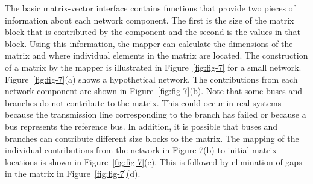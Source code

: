 \documentclass[12pt]{report} %
\begin{document}
The basic matrix-vector interface contains functions that provide two pieces of information about each network component. The first is the size of the matrix block that is contributed by the component and the second is the values in that block. Using this information, the mapper can calculate the dimensions of the matrix and where individual elements in the matrix are located. The construction of a matrix by the mapper is illustrated in  Figure~\ref{fig:fig-7} for a small network. Figure~\ref{fig:fig-7}(a) shows a hypothetical network. The contributions from each network component are shown in  Figure~\ref{fig:fig-7}(b). Note that some buses and branches do not contribute to the matrix. This could occur in real systems because the transmission line corresponding to the branch has failed or because a bus represents the reference bus. In addition, it is possible that buses and branches can contribute different size blocks to the matrix. The mapping of the individual contributions from the network in Figure 7(b) to initial matrix locations is shown in  Figure~\ref{fig:fig-7}(c). This is followed by elimination of gaps in the matrix in Figure~\ref{fig:fig-7}(d).
\end{document}
